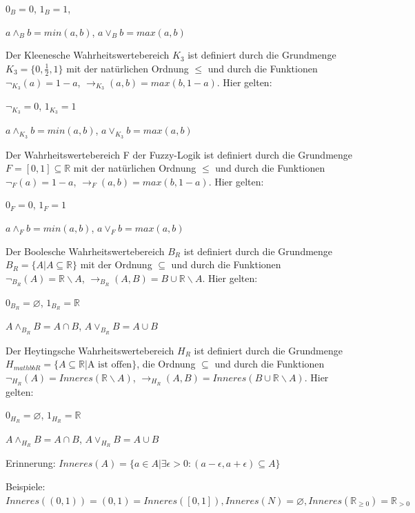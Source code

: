 \documentclass[a4paper]{article}
\begin{document}
\begin{multicols}{3}
\begin{itemize*}
          \begin{itemize*}
            \item
                  $0_B=0$, $1_B= 1$,
            \item
                  $a\wedge_B b= min(a,b)$, $a\vee_B b= max(a,b)$
          \end{itemize*}
    \item
          Der Kleenesche Wahrheitswertebereich $K_3$ ist definiert durch die
          Grundmenge $K_3=\{0,\frac{1}{2},1\}$ mit der natürlichen Ordnung
          $\leq$ und durch die Funktionen $\lnot_{K_3} (a) = 1 -a $,
          $\rightarrow_{K_3} (a,b) = max(b, 1-a)$. Hier gelten:
    \item
          $\lnot_{K_3} = 0$, $1_{K_3} = 1$
    \item
          $a\wedge_{K_3} b= min(a,b)$, $a\vee_{K_3} b= max(a,b)$
    \item
          Der Wahrheitswertebereich F der Fuzzy-Logik ist definiert durch die
          Grundmenge $F=[0,1]\subseteq\mathbb{R}$ mit der natürlichen Ordnung
          $\leq$ und durch die Funktionen $\lnot_F (a) = 1-a$,
          $\rightarrow_F (a,b) = max(b, 1-a)$. Hier gelten:
    \item
          $0_F= 0$, $1_F= 1$
    \item
          $a\wedge_F b= min(a,b)$, $a\vee_F b= max(a,b)$
    \item
          Der Boolesche Wahrheitswertebereich $B_R$ ist definiert durch die
          Grundmenge $B_R=\{A|A\subseteq \mathbb{R}\}$ mit der Ordnung
          $\subseteq$ und durch die Funktionen
          $\lnot_{B_R} (A) =\mathbb{R}\backslash A$,
          $\rightarrow_{B_R} (A,B) = B\cup\mathbb{R}\backslash A$. Hier gelten:
    \item
          $0_{B_R}=\varnothing$, $1_{B_R}=\mathbb{R}$
    \item
          $A\wedge_{B_R} B=A\cap B$, $A\vee_{B_R} B=A\cup B$
    \item
          Der Heytingsche Wahrheitswertebereich $H_R$ ist definiert durch die
          Grundmenge
          $H_{mathbb{R}} =\{A\subseteq\mathbb{R} | \text{A ist offen}\}$, die
          Ordnung $\subseteq$ und durch die Funktionen
          $\lnot_{H_R} (A) = Inneres(\mathbb{R}\backslash A)$,
          $\rightarrow_{H_R} (A,B) =Inneres(B\cup \mathbb{R}\backslash A)$. Hier
          gelten:
    \item
          $0_{H_R}=\varnothing$, $1_{H_R}=\mathbb{R}$
    \item
          $A\wedge_{H_R} B= A\cap B$, $A\vee_{H_R} B=A\cup B$
    \item
          Erinnerung:
          $Inneres(A) =\{a\in A|\exists \epsilon > 0 : (a-\epsilon,a+\epsilon)\subseteq A\}$
    \item
          Beispiele:
          $Inneres((0,1))=(0,1)=Inneres([0,1]),Inneres(N)=\varnothing,Inneres(\mathbb{R}_{\geq 0}) = \mathbb{R}_{> 0}$
  \end{itemize*}


\end{multicols}
\end{document}
